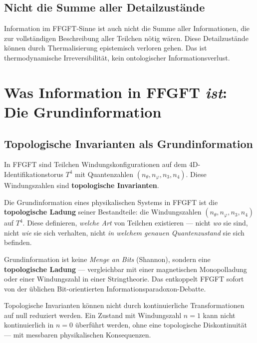 \subsection{Nicht die Summe aller Detailzustände}

Information im FFGFT-Sinne ist auch nicht die Summe aller Informationen, die zur vollständigen Beschreibung aller Teilchen nötig wären. Diese Detailzustände können durch Thermalisierung epistemisch verloren gehen. Das ist thermodynamische Irreversibilität, kein ontologischer Informationsverlust.

\section{Was Information in FFGFT \emph{ist}: Die Grundinformation}

\subsection{Topologische Invarianten als Grundinformation}

In FFGFT sind Teilchen Windungskonfigurationen auf dem 4D-Identifikationstorus $T^4$ mit Quantenzahlen $(n_\theta, n_\varphi, n_3, n_4)$. Diese Windungszahlen sind \textbf{topologische Invarianten}.

\begin{keyresult}
Die Grundinformation eines physikalischen Systems in FFGFT ist die \textbf{topologische Ladung} seiner Bestandteile: die Windungszahlen $(n_\theta, n_\varphi, n_3, n_4)$ auf $T^4$. Diese definieren, \emph{welche Art} von Teilchen existieren --- nicht \emph{wo} sie sind, nicht \emph{wie} sie sich verhalten, nicht \emph{in welchem genauen Quantenzustand} sie sich befinden.

Grundinformation ist keine \emph{Menge an Bits} (Shannon), sondern eine \textbf{topologische Ladung} --- vergleichbar mit einer magnetischen Monopolladung oder einer Windungszahl in einer Stringtheorie. Das entkoppelt FFGFT sofort von der üblichen Bit-orientierten Informationsparadoxon-Debatte.
\end{keyresult}

Topologische Invarianten können nicht durch kontinuierliche Transformationen auf null reduziert werden. Ein Zustand mit Windungszahl $n = 1$ kann nicht kontinuierlich in $n = 0$ überführt werden, ohne eine topologische Diskontinuität --- mit messbaren physikalischen Konsequenzen.

